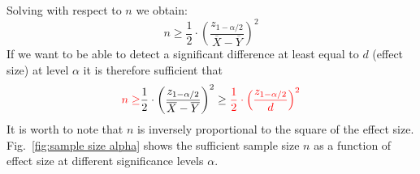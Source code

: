 \documentclass[14pt]{article}
\begin{document}
\newline
Solving with respect to $n$ we obtain:
\begin{equation}
n \geq \frac{1}{2}\cdot \left ( \frac{z_{1-\alpha/2}}{\overline{X}-\overline{Y}}  \right )^{2}
\end{equation}
\newline
If we want to be able to detect a significant difference at least equal to $d$ (effect size) at level $\alpha$ it is therefore sufficient that
 \begin{equation}
\textcolor{red}{n \geq} \frac{1}{2}\cdot \left ( \frac{z_{1-\alpha/2}}{\overline{X}-\overline{Y}}  \right )^{2} \geq\textcolor{red}{\frac{1}{2}\cdot \left ( \frac{z_{1-\alpha/2}}{d}  \right )^{2}}
\end{equation}
\newline
It is worth to note that $n$ is inversely proportional to the square of the effect size. \\
Fig.~\ref{fig:sample size alpha} shows the sufficient sample size $n$ as a function of effect size at different significance levels $\alpha$.
\end{document}
